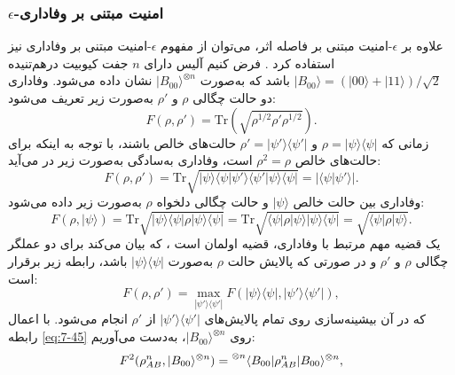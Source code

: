\subsubsection{$\epsilon$-امنیت مبتنی بر وفاداری}
\label{subsec:7-4-2-2}
علاوه بر $\epsilon$-امنیت مبتنی بر فاصله اثر، می‌توان از مفهوم $\epsilon$-امنیت مبتنی بر وفاداری نیز استفاده کرد \cite{7-58}. فرض کنیم آلیس دارای $n$ جفت کیوبیت درهم‌تنیده $|B_{00}\rangle = (|00\rangle + |11\rangle)/\sqrt{2}$ باشد که به‌صورت $|B_{00}\rangle^{\otimes n}$ نشان داده می‌شود. وفاداری دو حالت چگالی $\rho$ و $\rho'$ به‌صورت زیر تعریف می‌شود:
\begin{equation}
	F(\rho, \rho') = \text{Tr} \left( \sqrt{\rho^{1/2} \rho' \rho^{1/2}} \right).
	\label{eq:7-43}
\end{equation}
زمانی که $\rho = |\psi\rangle\langle\psi|$ و $\rho' = |\psi'\rangle\langle\psi'|$ حالت‌های خالص باشند، با توجه به اینکه برای حالت‌های خالص $\rho^2 = \rho$ است، وفاداری به‌سادگی به‌صورت زیر در می‌آید:
\begin{equation}
	F(\rho, \rho') = \text{Tr} \sqrt{|\psi\rangle\langle\psi|\psi'\rangle\langle\psi'|\psi\rangle\langle\psi|} = |\langle \psi | \psi' \rangle|.
	\label{eq:7-44}
\end{equation}
وفاداری بین حالت خالص $|\psi\rangle$ و حالت چگالی دلخواه $\rho$ به‌صورت زیر داده می‌شود:
\begin{equation}
	F(\rho, |\psi\rangle) = \text{Tr} \sqrt{|\psi\rangle\langle\psi| \rho |\psi\rangle\langle\psi|} = \text{Tr} \sqrt{\langle\psi|\rho|\psi\rangle |\psi\rangle\langle\psi|} = \sqrt{\langle \psi | \rho | \psi \rangle}.
	\label{eq:7-45}
\end{equation}
یک قضیه مهم مرتبط با وفاداری، قضیه اولمان است \cite{7-64}، که بیان می‌کند برای دو عملگر چگالی $\rho$ و $\rho'$ و در صورتی که پالایش حالت $\rho$ به‌صورت $|\psi\rangle\langle\psi|$ باشد، رابطه زیر برقرار است:
\begin{equation}
	F(\rho, \rho') = \max_{|\psi'\rangle\langle\psi'|} F(|\psi\rangle\langle\psi|, |\psi'\rangle\langle\psi'|),
	\label{eq:7-46}
\end{equation}
که در آن بیشینه‌سازی روی تمام پالایش‌های $|\psi'\rangle\langle\psi'|$ از $\rho'$ انجام می‌شود. با اعمال رابطه \eqref{eq:7-45} روی $|B_{00}\rangle^{\otimes n}$، به‌دست می‌آوریم:
\begin{equation}
	F^2(\rho_{AB}^n, |B_{00}\rangle^{\otimes n}) = \prescript{\otimes n}{}{\langle} B_{00} | \rho_{AB}^n | B_{00} \rangle^{\otimes n},
	\label{eq:7-47}
\end{equation}
